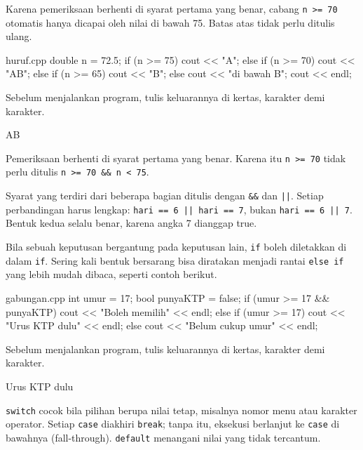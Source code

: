 \documentclass[a4paper]{article}
\begin{document}
Karena pemeriksaan berhenti di syarat pertama yang benar, cabang \texttt{n >= 70} otomatis hanya dicapai oleh nilai di bawah 75. Batas atas tidak perlu ditulis ulang.

\begin{MKode}{huruf.cpp}
double n = 72.5;
if (n >= 75) {
    cout << "A";
} else if (n >= 70) {
    cout << "AB";
} else if (n >= 65) {
    cout << "B";
} else {
    cout << "di bawah B";
}
cout << endl;
\end{MKode}
\begin{Tebak}[]
Sebelum menjalankan program, tulis keluarannya di kertas, karakter demi karakter.
\end{Tebak}
\begin{Jawaban}[]
\begin{MKeluaran}[]
AB
\end{MKeluaran}
Pemeriksaan berhenti di syarat pertama yang benar. Karena itu \texttt{n >= 70} tidak perlu ditulis \texttt{n >= 70 \&\& n < 75}.
\end{Jawaban}
Syarat yang terdiri dari beberapa bagian ditulis dengan \texttt{\&\&} dan \texttt{||}. Setiap perbandingan harus lengkap: \texttt{hari == 6 || hari == 7}, bukan \texttt{hari == 6 || 7}. Bentuk kedua selalu benar, karena angka 7 dianggap true.

Bila sebuah keputusan bergantung pada keputusan lain, \texttt{if} boleh diletakkan di dalam \texttt{if}. Sering kali bentuk bersarang bisa diratakan menjadi rantai \texttt{else if} yang lebih mudah dibaca, seperti contoh berikut.

\begin{MKode}{gabungan.cpp}
int umur = 17;
bool punyaKTP = false;
if (umur >= 17 && punyaKTP) {
    cout << "Boleh memilih" << endl;
} else if (umur >= 17) {
    cout << "Urus KTP dulu" << endl;
} else {
    cout << "Belum cukup umur" << endl;
}
\end{MKode}
\begin{Tebak}[]
Sebelum menjalankan program, tulis keluarannya di kertas, karakter demi karakter.
\end{Tebak}
\begin{Jawaban}[]
\begin{MKeluaran}[]
Urus KTP dulu
\end{MKeluaran}

\end{Jawaban}
\texttt{switch} cocok bila pilihan berupa nilai tetap, misalnya nomor menu atau karakter operator. Setiap \texttt{case} diakhiri \texttt{break}; tanpa itu, eksekusi berlanjut ke \texttt{case} di bawahnya (fall-through). \texttt{default} menangani nilai yang tidak tercantum.
\end{document}
